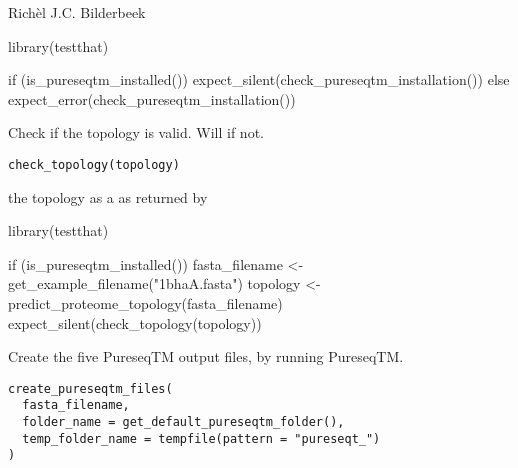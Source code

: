 \documentclass[letterpaper]{book}
\begin{document}
%
\begin{Author}\relax
Richèl J.C. Bilderbeek
\end{Author}
%
\begin{Examples}
\begin{ExampleCode}
library(testthat)

if (is_pureseqtm_installed()) {
  expect_silent(check_pureseqtm_installation())
} else {
  expect_error(check_pureseqtm_installation())
}
\end{ExampleCode}
\end{Examples}
%
\begin{Description}\relax
Check if the topology is valid.
Will  if not.
\end{Description}
%
\begin{Usage}
\begin{verbatim}
check_topology(topology)
\end{verbatim}
\end{Usage}
%
\begin{Arguments}
\begin{ldescription}
\item[\code{topology}] the topology as a 
as returned by 
\end{ldescription}
\end{Arguments}
%
\begin{Examples}
\begin{ExampleCode}
library(testthat)

if (is_pureseqtm_installed()) {
  fasta_filename <- get_example_filename("1bhaA.fasta")
  topology <- predict_proteome_topology(fasta_filename)
  expect_silent(check_topology(topology))
}
\end{ExampleCode}
\end{Examples}
%
\begin{Description}\relax
Create the five PureseqTM output files, by running PureseqTM.
\end{Description}
%
\begin{Usage}
\begin{verbatim}
create_pureseqtm_files(
  fasta_filename,
  folder_name = get_default_pureseqtm_folder(),
  temp_folder_name = tempfile(pattern = "pureseqt_")
)
\end{verbatim}
\end{Usage}
\end{document}

